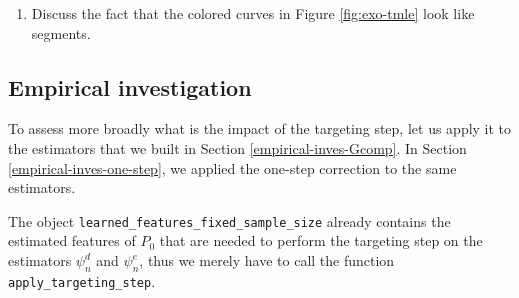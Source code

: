 \documentclass[11pt,openright,twoside]{book}
\providecommand{\tightlist}{%
  \setlength{\itemsep}{0pt}\setlength{\parskip}{0pt}}
\theoremstyle{definition}
\theoremstyle{definition}
\theoremstyle{definition}
\theoremstyle{remark}
\begin{document}
\begin{enumerate}
\def\labelenumi{\arabic{enumi}.}
\setcounter{enumi}{2}
\tightlist
\item
  Discuss the fact that the colored curves in Figure \ref{fig:exo-tmle}
  look like segments.
\end{enumerate}

\hypertarget{empirical-investigation}{%
\subsection{Empirical investigation}\label{empirical-investigation}}

To assess more broadly what is the impact of the targeting step, let us apply
it to the estimators that we built in Section \ref{empirical-inves-Gcomp}. In
Section \ref{empirical-inves-one-step}, we applied the one-step correction to
the same estimators.

The object \texttt{learned\_features\_fixed\_sample\_size} already contains the estimated
features of \(P_{0}\) that are needed to perform the targeting step on the
estimators \(\psi_{n}^{d}\) and \(\psi_{n}^{e}\), thus we merely have to call the
function \texttt{apply\_targeting\_step}.
\end{document}
